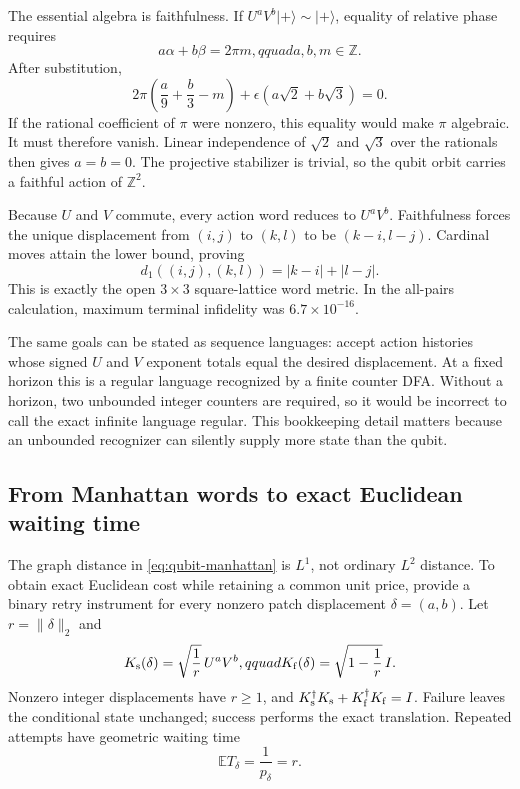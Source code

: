 \documentclass[11pt]{article}
\newcommand{\E}{\mathbb E}
\begin{document}
The essential algebra is faithfulness. If
$U^aV^b|+\rangle\sim|+\rangle$, equality of relative phase requires
\begin{equation}
 a\alpha+b\beta=2\pi m,qquad a,b,m\in\mathbb Z. \label{eq:phase-relation}
\end{equation}
After substitution,
\begin{equation}
 2\pi\left(\frac a9+\frac b3-m\right)
 +\epsilon(a\sqrt2+b\sqrt3)=0. \label{eq:faithfulness-proof}
\end{equation}
If the rational coefficient of $\pi$ were nonzero, this equality would make
$\pi$ algebraic. It must therefore vanish. Linear independence of
$\sqrt2$ and $\sqrt3$ over the rationals then gives $a=b=0$. The projective
stabilizer is trivial, so the qubit orbit carries a faithful action of
$\mathbb Z^2$.

Because $U$ and $V$ commute, every action word reduces to $U^aV^b$.
Faithfulness forces the unique displacement from $(i,j)$ to $(k,l)$ to be
$(k-i,l-j)$. Cardinal moves attain the lower bound, proving
\begin{equation}
 d_1((i,j),(k,l))=|k-i|+|l-j|. \label{eq:qubit-manhattan}
\end{equation}
This is exactly the open $3\times3$ square-lattice word metric. In the
all-pairs calculation, maximum terminal infidelity was
$6.7\times10^{-16}$.

The same goals can be stated as sequence languages: accept action histories
whose signed $U$ and $V$ exponent totals equal the desired displacement. At a
fixed horizon this is a regular language recognized by a finite counter DFA.
Without a horizon, two unbounded integer counters are required, so it would be
incorrect to call the exact infinite language regular. This bookkeeping detail
matters because an unbounded recognizer can silently supply more state than the
qubit.

\subsection{From Manhattan words to exact Euclidean waiting time}

The graph distance in \cref{eq:qubit-manhattan} is $L^1$, not ordinary
$L^2$ distance. To obtain exact Euclidean cost while retaining a common unit
price, provide a binary retry instrument for every nonzero patch displacement
$\delta=(a,b)$. Let $r=\|\delta\|_2$ and
\begin{equation}
 K_{\rm s}(\delta)=\sqrt{\frac1r}\,U^aV^b,qquad
 K_{\rm f}(\delta)=\sqrt{1-\frac1r}\,I. \label{eq:retry-kraus}
\end{equation}
Nonzero integer displacements have $r\ge1$, and
$K_{\rm s}^\dagger K_{\rm s}+K_{\rm f}^\dagger K_{\rm f}=I$. Failure leaves
the conditional state unchanged; success performs the exact translation.
Repeated attempts have geometric waiting time
\begin{equation}
 \E T_\delta=\frac1{p_\delta}=r. \label{eq:retry-mean}
\end{equation}
\end{document}
